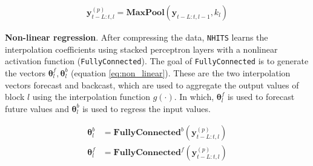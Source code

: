 \begin{align}
    \mathbf{y}_{t-L:t, l}^{(p)} = \mathbf{MaxPool}\left( \mathbf{y}_{t-L:t, l-1}, k_l \right)
    \label{eq:maxPool}
\end{align}


\textbf{Non-linear regression}. After compressing the data, \verb|NHITS| learns the interpolation coefficients using stacked perceptron layers with a nonlinear activation function (\verb|FullyConnected|). The goal of \verb|FullyConnected| is to generate the vectors $\mathbf{\theta}_l^f, \mathbf{\theta}_l^b$ (equation \ref{eq:non_linear}). These are the two interpolation vectors forecast and backcast, which are used to aggregate the output values of block $l$ using the interpolation function $g(\cdot)$. In which, $\mathbf{\theta}_l^f$ is used to forecast future values and $\mathbf{\theta}_l^b$ is used to regress the input values.

\begin{align}
    \mathbf{\theta}_l^b &= \mathbf{FullyConnected}^b \left( \mathbf{y}_{t-L:t, l}^{(p)} \right)\\
    \mathbf{\theta}_l^f &= \mathbf{FullyConnected}^f \left( \mathbf{y}_{t-L:t, l}^{(p)} \right)\\
    \label{eq:non_linear}
\end{align}


